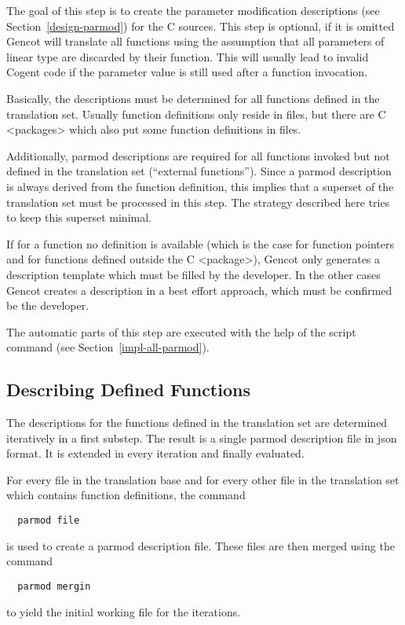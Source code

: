 The goal of this step is to create the parameter modification descriptions (see Section~\ref{design-parmod})
for the C sources. This step is optional, if it is omitted Gencot will translate all functions using the 
assumption that all parameters of linear type are discarded by their function. This will usually lead to
invalid Cogent code if the parameter value is still used after a function invocation.

Basically, the descriptions must be determined for all functions defined in the translation
set. Usually function definitions only reside in  files, but there are C <packages> which also put 
some function definitions in  files.

Additionally, parmod descriptions are required for all functions invoked but not defined in
the translation set (``external functions''). Since a parmod description is always derived from the function 
definition, this implies that a superset of the translation set must be processed in this step. The strategy 
described here tries to keep this superset minimal. 

If for a function no definition is available (which is the case for function pointers and for functions
defined outside the C <package>), Gencot only generates a description template which must be filled by the
developer. In the other cases Gencot creates a description in a best effort approach, which must be confirmed
be the developer.

The automatic parts of this step are executed with the help of the script command  (see 
Section~\ref{impl-all-parmod}).

\subsection{Describing Defined Functions}
\label{app-parmod-defined}

The descriptions for the functions defined in the translation set are determined iteratively in a first substep. 
The result is a single parmod description file in json format. It is extended in every iteration and finally
evaluated.

For every file in the translation base and for every other file in the translation set which contains
function definitions, the command
\begin{verbatim}
  parmod file
\end{verbatim}
is used to create a parmod description file. These files are then merged using the command
\begin{verbatim}
  parmod mergin
\end{verbatim}
to yield the initial working file for the iterations. 

